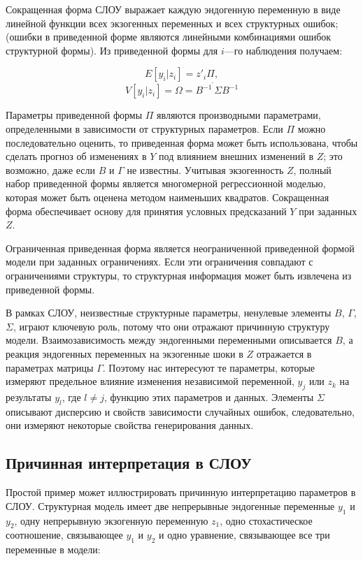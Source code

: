 	
	Сокращенная форма СЛОУ выражает каждую эндогенную переменную в виде линейной функции всех экзогенных переменных и всех структурных ошибок; (ошибки в приведенной форме являются линейными комбинациями ошибок структурной формы). Из приведенной формы для $i$---го наблюдения получаем:

\begin{equation}
E[y_{i}|z_{i}]=z'_{i}\Pi,
\end{equation}
\begin{equation}
V[y_{i}|z_{i}]=\Omega=B^{-1^{'}} \Sigma B^{-1}
\end{equation}
 
 
Параметры приведенной формы $\Pi$ являются производными параметрами, определенными в зависимости от структурных параметров. Если $\Pi$  можно последовательно оценить, то приведенная форма может быть использована, чтобы сделать прогноз об изменениях в $Y$ под влиянием внешних изменений в $Z$; это возможно, даже если $B$ и $\Gamma$ не известны. Учитывая экзогенность $Z$, полный набор приведенной формы является многомерной регрессионной моделью, которая может быть оценена методом наименьших квадратов. Сокращенная форма обеспечивает основу для принятия условных предсказаний $Y$ при заданных $Z$. 


	Ограниченная приведенная форма является неограниченной приведенной формой модели при заданных ограничениях. Если эти ограничения совпадают с ограничениями структуры, то структурная информация может быть извлечена из приведенной формы. 
	
	
	В рамках СЛОУ, неизвестные структурные параметры, ненулевые элементы $B$, $\Gamma$,$\Sigma$, играют ключевую роль, потому что они отражают причинную структуру модели. Взаимозависимость между эндогенными переменными описывается $B$, а реакция эндогенных переменных на экзогенные шоки в $Z$ отражается в параметрах матрицы $\Gamma$. Поэтому нас интересуют те параметры, которые измеряют предельное влияние изменения независимой переменной, $y_{j}$ или $z_{k}$ на результаты $y_{l}$, где $l\not=j$, функцию этих параметров и данных. Элементы $\Sigma$ описывают дисперсию и свойств зависимости случайных ошибок, следовательно, они измеряют некоторые свойства генерирования данных. 
	

\subsection{Причинная интерпретация в СЛОУ}


Простой пример может иллюстрировать причинную интерпретацию параметров в СЛОУ. Структурная модель имеет две непрерывные эндогенные переменные $y_{1}$ и $y_{2}$, одну непрерывную экзогенную переменную $z_{1}$, одно стохастическое соотношение, связывающее $y_{1}$ и $y_{2}$ и одно уравнение, связывающее все три переменные в модели:


